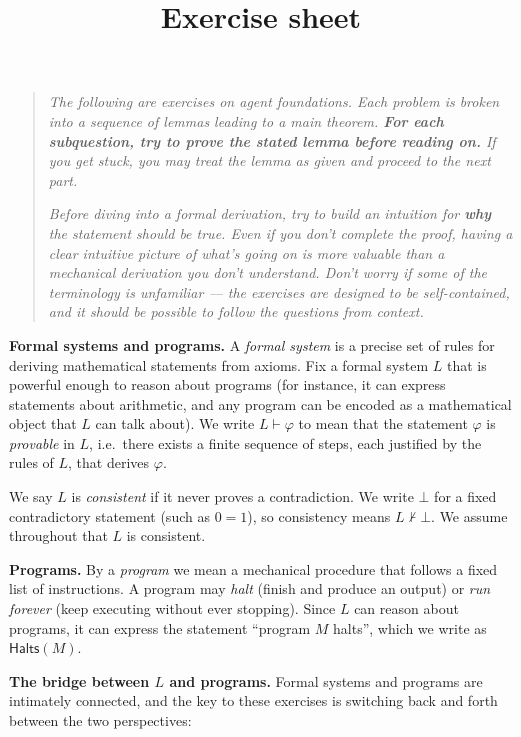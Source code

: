 \documentclass[8pt]{article}
\title{Exercise sheet}
\begin{document}
\maketitle
\begin{quote}
    \textit{The following are exercises on agent foundations. Each problem is broken into a sequence of lemmas leading to a main theorem. \textbf{For each subquestion, try to prove the stated lemma before reading on.} If you get stuck, you may treat the lemma as given and proceed to the next part.}

    \medskip
    \textit{Before diving into a formal derivation, try to build an intuition for \textbf{why} the statement should be true. Even if you don't complete the proof, having a clear intuitive picture of what's going on is more valuable than a mechanical derivation you don't understand. Don't worry if some of the terminology is unfamiliar --- the exercises are designed to be self-contained, and it should be possible to follow the questions from context.}
\end{quote}
\noindent
\textbf{Formal systems and programs.} A \emph{formal system} is a precise set of rules for
deriving mathematical statements from axioms. Fix a formal system $L$ that is powerful
enough to reason about programs (for instance, it can express statements about
arithmetic, and any program can be encoded as a mathematical object that $L$ can talk
about). We write $L \vdash \varphi$ to mean that the statement $\varphi$ is
\emph{provable} in $L$, i.e.\ there exists a finite sequence of steps, each justified by
the rules of $L$, that derives $\varphi$.

\medskip
\noindent
We say $L$ is \emph{consistent} if it never proves a contradiction. We write $\bot$ for
a fixed contradictory statement (such as $0 = 1$), so consistency means $L \nvdash \bot$.
We assume throughout that $L$ is consistent.

\medskip
\noindent
\textbf{Programs.} By a \emph{program} we mean a mechanical procedure that follows a
fixed list of instructions. A program may \emph{halt} (finish and produce an output)
or \emph{run forever} (keep executing without ever stopping). Since $L$ can reason about
programs, it can express the statement ``program $M$ halts'', which we write as
$\mathsf{Halts}(M)$.

\medskip
\noindent
\textbf{The bridge between $L$ and programs.} Formal systems and programs are
intimately connected, and the key to these exercises is switching back and forth between
the two perspectives:
\end{document}
